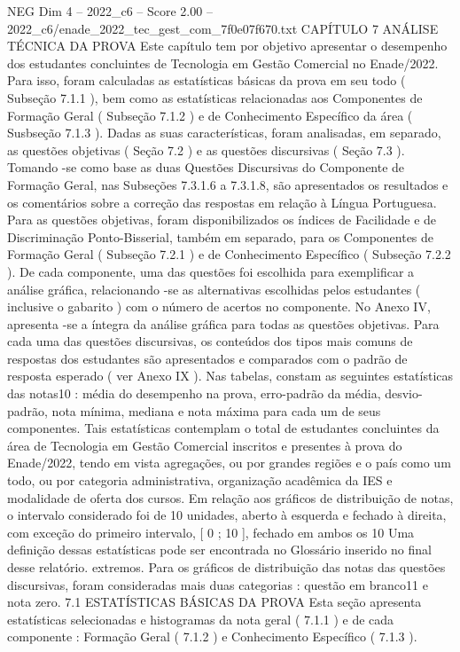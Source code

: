 \begin{textsample}{NEG Dim 4 – 2022\_c6 – Score 2.00 – 2022\_c6/enade\_2022\_tec\_gest\_com\_7f0e07f670.txt}  \label{ex:f4_neg_272}
CAPÍTULO 7 ANÁLISE TÉCNICA DA PROVA Este capítulo tem por objetivo apresentar o desempenho dos estudantes concluintes de Tecnologia em Gestão Comercial no Enade/2022.
Para isso, foram calculadas as estatísticas básicas da prova em seu todo ( Subseção 7.1.1 ), bem como as estatísticas relacionadas aos Componentes de Formação Geral ( Subseção 7.1.2 ) e de Conhecimento Específico da área ( Susbseção 7.1.3 ).
Dadas as suas características, foram analisadas, em separado, as questões objetivas ( Seção 7.2 ) e as questões discursivas ( Seção 7.3 ).
Tomando -se como base as duas Questões Discursivas do Componente de Formação Geral, nas Subseções 7.3.1.6 a 7.3.1.8, são apresentados os resultados e os comentários sobre a correção das respostas em relação à Língua Portuguesa.
Para as questões objetivas, foram disponibilizados os índices de Facilidade e de Discriminação Ponto-Bisserial, também em separado, para os Componentes de Formação Geral ( Subseção 7.2.1 ) e de Conhecimento Específico ( Subseção 7.2.2 ).
De cada componente, uma das questões foi escolhida para exemplificar a análise gráfica, relacionando -se as alternativas escolhidas pelos estudantes ( inclusive o gabarito ) com o número de acertos no componente.
No Anexo IV, apresenta -se a íntegra da análise gráfica para todas as questões objetivas.
Para cada uma das questões discursivas, os conteúdos dos tipos mais comuns de respostas dos estudantes são apresentados e comparados com o padrão de resposta esperado ( ver Anexo IX ).
Nas tabelas, constam as seguintes estatísticas das notas10 : média do desempenho na prova, erro-padrão da média, desvio-padrão, nota mínima, mediana e nota máxima para cada um de seus componentes.
Tais estatísticas contemplam o total de estudantes concluintes da área de Tecnologia em Gestão Comercial inscritos e presentes à prova do Enade/2022, tendo em vista agregações, ou por grandes regiões e o país como um todo, ou por categoria administrativa, organização acadêmica da IES e modalidade de oferta dos cursos.
Em relação aos gráficos de distribuição de notas, o intervalo considerado foi de 10 unidades, aberto à esquerda e fechado à direita, com exceção do primeiro intervalo, [ 0 ; 10 ], fechado em ambos os 10 Uma definição dessas estatísticas pode ser encontrada no Glossário inserido no final desse relatório. extremos.
Para os gráficos de distribuição das notas das questões discursivas, foram consideradas mais duas categorias : questão em branco11 e nota zero. 7.1 ESTATÍSTICAS BÁSICAS DA PROVA Esta seção apresenta estatísticas selecionadas e histogramas da nota geral ( 7.1.1 ) e de cada componente : Formação Geral ( 7.1.2 ) e Conhecimento Específico ( 7.1.3 ).

\end{textsample}
